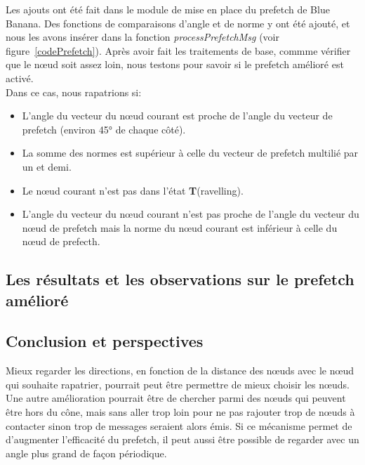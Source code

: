 \par Les ajouts ont été fait dans le module de mise en place du prefetch de Blue Banana. Des fonctions de comparaisons d'angle et de norme y ont été ajouté, et nous les avons insérer dans la fonction \textit{processPrefetchMsg} (voir figure~\ref{codePrefetch}). Après avoir fait les traitements de base, commme vérifier que le nœud soit assez loin, nous testons pour savoir si le prefetch amélioré est activé. 
\newline
\\ Dans ce cas, nous rapatrions si:
        \begin{itemize}
        \renewcommand{\labelitemi}{$\bullet$}
                \item L'angle du vecteur du nœud courant est proche de l'angle du vecteur de prefetch (environ 45° de chaque côté).
		\item La somme des normes est supérieur à celle du vecteur de prefetch multilié par un et demi. 
                \item Le nœud courant n'est pas dans l'état \textbf{T}(ravelling).
		\item L'angle du vecteur du nœud courant n'est pas proche de l'angle du vecteur du nœud de prefetch mais la norme du nœud courant est inférieur à celle du nœud de prefecth. 
        \end{itemize}


\lstset{numbers=left,basicstyle=\scriptsize, numberstyle=\tiny, stepnumber=5, numbersep=5pt}




\subsection{Les résultats et les observations sur le prefetch amélioré}



\subsection{Conclusion et perspectives}
Mieux regarder les directions, en fonction de la distance des nœuds avec le nœud qui souhaite rapatrier, pourrait peut être permettre de mieux choisir les nœuds.
Une autre amélioration pourrait être de chercher parmi des nœuds qui peuvent être hors du cône, mais sans aller trop loin pour ne pas rajouter trop de nœuds à contacter sinon trop de messages seraient alors émis. Si ce mécanisme permet de d'augmenter l'efficacité du prefetch, il peut aussi être possible de regarder avec un angle plus grand de façon périodique.


\newpage
